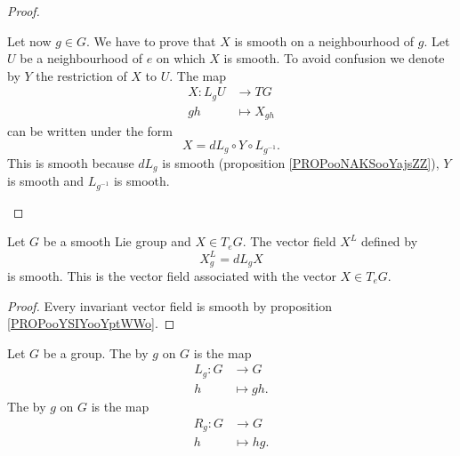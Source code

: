 \begin{proof}
\begin{subproof}
		\spitem[Elsewhere]
		Let now \( g\in G\). We have to prove that \( X\) is smooth on a neighbourhood of \( g\). Let \( U\) be a neighbourhood of \( e\) on which \( X\) is smooth. To avoid confusion we denote by \( Y\) the restriction of \( X\) to \( U\). The map
		\begin{equation}
			\begin{aligned}
				X\colon L_gU & \to TG         \\
				gh           & \mapsto X_{gh}
			\end{aligned}
		\end{equation}
		can be written under the form
		\begin{equation}
			X=dL_g\circ Y\circ L_{g^{-1}}.
		\end{equation}
		This is smooth because \( dL_g\) is smooth (proposition \ref{PROPooNAKSooYajsZZ}), \( Y\) is smooth and \( L_{g^{-1}}\) is smooth.
	\end{subproof}
\end{proof}


\begin{lemmaDef}        \label{DEFooSSDYooOwjHso}
	Let \( G\) be a smooth Lie group and \( X\in T_eG\). The vector field \( X^L\) defined by
	\begin{equation}
		X^L_g=dL_gX
	\end{equation}
	is smooth. This is the  vector field associated with the vector \( X\in T_eG\).
\end{lemmaDef}

\begin{proof}
	Every invariant vector field is smooth by proposition \ref{PROPooYSIYooYptWWo}.
\end{proof}

\begin{definition}
	Let \( G\) be a group. The  by \( g\) on \( G\) is the map
	\begin{equation}
		\begin{aligned}
			L_g\colon G & \to G       \\
			h           & \mapsto gh.
		\end{aligned}
	\end{equation}
	The  by \( g\) on \( G\) is the map
	\begin{equation}
		\begin{aligned}
			R_g\colon G & \to G       \\
			h           & \mapsto hg.
		\end{aligned}
	\end{equation}
\end{definition}

